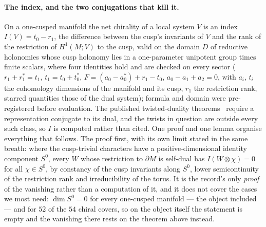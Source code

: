 \documentclass[11pt,a4paper]{article}
\theoremstyle{definition}
\theoremstyle{remark}
\begin{document}
\paragraph{The index, and the two conjugations that kill it.} On a one-cusped manifold the net chirality of a
local system $V$ is an index $I(V) = t_0 - r_1$, the difference between the cusp's invariants of $V$ and the rank
of the restriction of $H^1(M;V)$ to the cusp, valid on the domain $D$ of reductive holonomies whose cusp holonomy lies in a one-parameter unipotent group times
finite scalars, where four identities hold and are checked on every sector ($r_1 + r_1^* = t_1$, $t_1 = t_0 + t_0^*$,
$F = (a_0 - a_0^*) + r_1 - t_0$, $a_0 - a_1 + a_2 = 0$, with $a_i$, $t_i$ the cohomology dimensions of the manifold and its cusp,
$r_1$ the restriction rank, starred quantities those of the dual system); formula and domain were pre-registered before
evaluation. The
published twisted-duality theorems~\cite{fkk} require a representation conjugate to its dual, and the twists
in question are outside every such class, so $I$ is computed rather than cited. One proof and one lemma organise everything that follows. The proof first, with its own limit stated
in the same breath: where the cusp-trivial characters have a positive-dimensional identity component $S^0$, every
$W$ whose restriction to $\partial M$ is self-dual has $I(W \otimes \chi) = 0$ for all $\chi \in S^0$, by constancy of the
cusp invariants along $S^0$, lower semicontinuity of the restriction rank and irreducibility of the torus. It is the
record's only \emph{proof} of the vanishing rather than a computation of it, and it does not cover the cases we most
need: $\dim S^0 = 0$ for every one-cusped manifold --- the object included --- and for $52$ of the $54$ chiral covers, so
on the object itself the statement is empty and the vanishing there rests on the theorem above instead.
\end{document}
